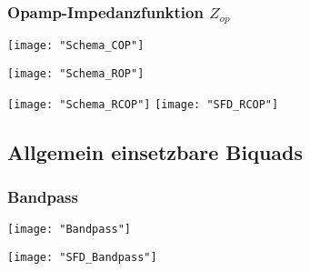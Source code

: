 

\subsubsection{Opamp-Impedanzfunktion $Z_{op}$}
\begin{minipage}[t]{0.3\textwidth}
	\vspace{0pt}
	\centering
	\texttt{[image: "Schema\_COP"]}
\end{minipage}\hspace{0.05\textwidth}
\begin{minipage}[t]{0.3\textwidth}
	\vspace{0pt}
	\centering
	\texttt{[image: "Schema\_ROP"]}
\end{minipage}
\begin{minipage}[t]{0.3\textwidth}
	\vspace{0pt}
	\centering
	\texttt{[image: "Schema\_RCOP"]}
	\texttt{[image: "SFD\_RCOP"]}
\end{minipage}
\vspace{2mm}



\subsection{Allgemein einsetzbare Biquads}
\subsubsection{Bandpass}
\begin{minipage}[t]{0.45\textwidth}
	\vspace{0pt}
	\texttt{[image: "Bandpass"]}
\end{minipage}\hspace{0.05\textwidth}
\begin{minipage}[t]{0.45\textwidth}
	\vspace{0pt}
	\texttt{[image: "SFD\_Bandpass"]}
\end{minipage}\\
\begin{minipage}[t]{\textwidth}
	\vspace{0pt}
	\centering
\end{minipage}
\vspace{2mm}

